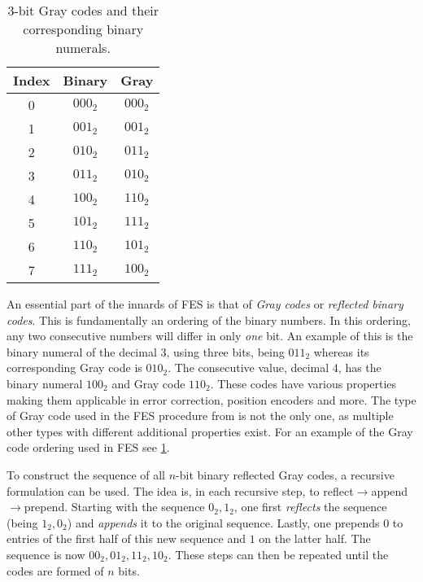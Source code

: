 \begin{table}[t]
    \begin{center}
        \begin{tabular}{||c|c|c||}
            \hline
            Index & Binary & Gray \\
            \hline
            0 & $000_2$ & $000_2$\\
            1 & $001_2$ & $001_2$\\
            2 & $010_2$ & $011_2$\\
            3 & $011_2$ & $010_2$\\
            4 & $100_2$ & $110_2$\\
            5 & $101_2$ & $111_2$\\
            6 & $110_2$ & $101_2$\\
            7 & $111_2$ & $100_2$\\
            \hline
        \end{tabular}
    \end{center}
    \caption{3-bit Gray codes and their corresponding binary numerals.} \label{tbl:gray}
\end{table}

An essential part of the innards of FES is that of \textit{Gray codes} or \textit{reflected binary codes}. This is fundamentally an ordering of the binary numbers. In this ordering, any two consecutive numbers will differ in only \textit{one} bit. An example of this is the binary numeral of the decimal 3, using three bits, being $011_2$ whereas its corresponding Gray code is $010_2$.
The consecutive value, decimal 4, has the binary numeral $100_2$ and Gray code $110_2$. These codes have various properties making them applicable in error correction, position encoders and more. The type of Gray code used in the FES procedure from \cite{ches-2010-23990, cryptoeprint:2013/436} is not the only one, as multiple other types with different additional properties exist. For an example of the Gray code ordering used in FES see \cref{tbl:gray}.

To construct the sequence of all $n$-bit binary reflected Gray codes, a recursive formulation can be used. The idea is, in each recursive step, to reflect$\rightarrow$append$\rightarrow$prepend. Starting with the sequence $0_2, 1_2$, one first \textit{reflects} the sequence (being $1_2, 0_2$) and \textit{appends} it to the original sequence. Lastly, one prepends $0$ to entries of the first half of this new sequence and $1$ on the latter half. The sequence is now $00_2, 01_2, 11_2, 10_2$. These steps can then be repeated until the codes are formed of $n$ bits.

